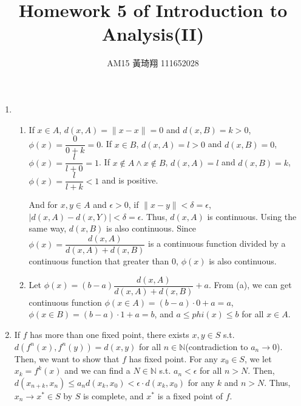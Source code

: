 \documentclass[12pt]{article}
\title{Homework 5 of Introduction to Analysis(II)}
\author{AM15 黃琦翔 111652028}
\begin{document}
\maketitle
\begin{enumerate}
    \item \begin{enumerate}
        \item If $x\in A$, $d(x, A) = \| x-x \| = 0$ and $d(x, B) = k > 0$, $\phi(x) = \dfrac{0}{0 + k} = 0$.
        If $x\in B$, $d(x, A) = l > 0$ and $d(x, B) = 0$, $\phi(x) = \dfrac{l}{l + 0} = 1$.
        If $x \notin A \wedge x \notin B$, $d(x, A) = l$ and $d(x, B) = k$, $\phi(x) = \dfrac{l}{l+k} < 1$ and is positive.

        And for $x, y \in A$ and $\epsilon > 0$,
        if $\| x- y \| < \delta = \epsilon$, 
        $|d(x, A) - d(x, Y)| < \delta = \epsilon$.
        Thus, $d(x, A)$ is continuous.
        Using the same way, $d(x, B)$ is also continuous.
        Since $\phi(x) = \dfrac{d(x, A)}{d(x, A)+d(x, B)}$ is a continuous function divided by a continuous function that greater than $0$,
        $\phi(x)$ is also continuous.

        \item Let $\phi(x) = (b-a)\dfrac{d(x, A)}{d(x, A) + d(x, B)} + a$.
        From (a), we can get continuous function $\phi(x\in A) = (b-a)\cdot 0 + a = a$, $\phi(x\in B) = (b-a)\cdot 1 + a = b$,
        and $a \leq phi(x)\leq b$ for all $x\in A$.
    \end{enumerate}

    \item If $f$ has more than one fixed point, there exists $x, y\in S$ s.t. $d(f^n(x), f^n(y)) = d(x, y)$ for all $n\in\mathbb{N}$(contradiction to $a_n \to 0$).
    Then, we want to show that $f$ has fixed point.
    For any $x_0\in S$, we let $x_k = f^k(x)$ and we can find a $N\in\mathbb{N}$ s.t. $a_n < \epsilon$ for all $n > N$.
    Then, $d(x_{n+k}, x_n) \leq a_n d(x_k, x_0) < \epsilon\cdot d(x_k, x_0)$ for any $k$ and $n > N$.
    Thus, $x_n \to x^*\in S$ by $S$ is complete, and $x^*$ is a fixed point of $f$.


\end{enumerate}
\end{document}
